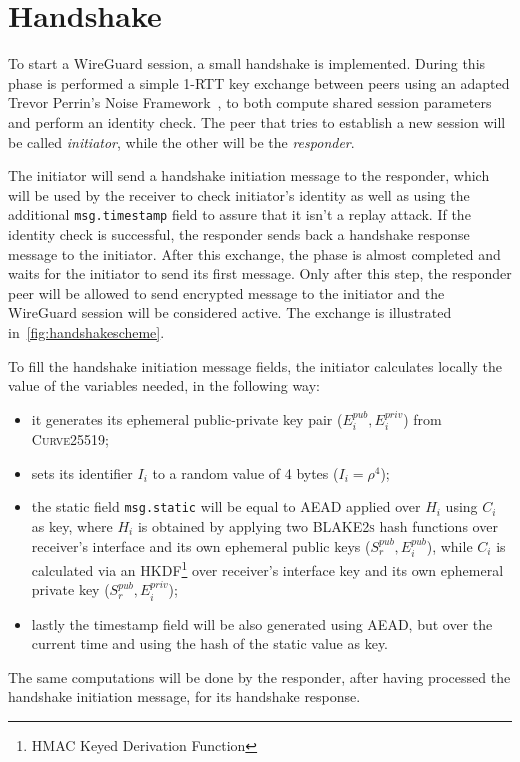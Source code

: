 \documentclass[light]{academica}
\begin{document}
\section{Handshake}\label{sec:handshake}

To start a WireGuard session, a small handshake is implemented.
During this phase is performed a simple 1-RTT key exchange between peers using an adapted Trevor Perrin’s Noise Framework~\cite{perrinnoise}, to both compute shared session parameters and perform an identity check.
The peer that tries to establish a new session will be called \textit{initiator}, while the other will be the \textit{responder}.

The initiator will send a handshake initiation message to the responder, which will be used by the receiver to check initiator's identity as well as using the additional \texttt{msg.timestamp} field to assure that it isn't a replay attack.
If the identity check is successful, the responder sends back a handshake response message to the initiator.
After this exchange, the phase is almost completed and waits for the initiator to send its first message.
Only after this step, the responder peer will be allowed to send encrypted message to the initiator and the WireGuard session will be considered active.
The exchange is illustrated in~\autoref{fig:handshakescheme}.

To fill the handshake initiation message fields, the initiator calculates locally the value of the variables needed, in the following way:
\begin{itemize}
  \item it generates its ephemeral public-private key pair ($E_i^{pub}, E_i^{priv}$) from \textsc{Curve25519};
  \item sets its identifier $I_i$ to a random value of 4 bytes (\ie $I_i = \rho^4$);
  \item the static field \texttt{msg.static} will be equal to AEAD applied over $H_i$ using $C_i$ as key, where $H_i$ is obtained by applying two \textsc{BLAKE2s} hash functions over receiver's interface and its own ephemeral public keys (\ie $S_r^{pub}, E_i^{pub}$), while $C_i$ is calculated via an HKDF\footnote{HMAC Keyed Derivation Function} over receiver's interface key and its own ephemeral private key ($S_r^{pub}, E_i^{priv}$);
  \item lastly the timestamp field will be also generated using AEAD, but over the current time and using the hash of the static value as key.
\end{itemize}
The same computations will be done by the responder, after having processed the handshake initiation message, for its handshake response.
\end{document}
